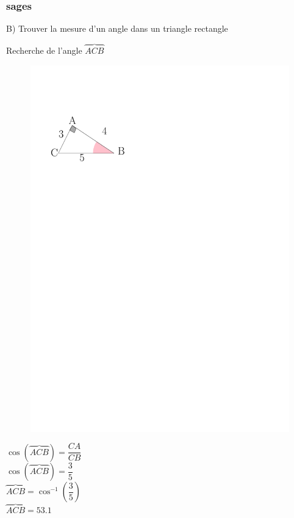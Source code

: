 \documentclass{beamer}
\begin{document}
\begin{frame}
  \frametitle{{}sages}

  B) Trouver la mesure d'un angle dans un triangle rectangle

  \begin{exampleblock}{Recherche de l'angle $\overbrace{ACB}$} 
    
    \begin{multicols}{2}

      \begin{figure}[H]
	      \centering
	      \includegraphics[width=\linewidth]{sources/2/rec-a3.pdf}
	    \end{figure}

      $\cos(\overbrace{ACB}) = \dfrac{CA}{CB}$\\
      $\cos(\overbrace{ACB}) = \dfrac{3}{5}$\\
      $\overbrace{ACB} = \cos^{-1} \left( \dfrac{3}{5} \right)$\\
      $\overbrace{ACB} = 53.1$
      
    \end{multicols}
  \end{exampleblock}  
  
\end{frame}
\end{document}
